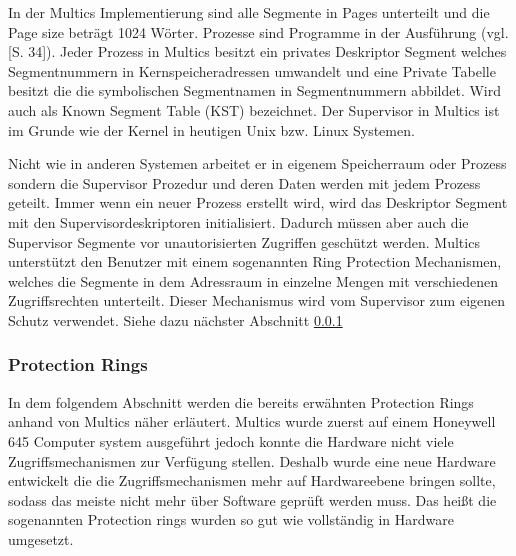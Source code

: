\documentclass[german, 9pt,technote]{IEEEtran}
\begin{document}
	      In der Multics Implementierung sind alle Segmente in Pages unterteilt und die Page size betr\"agt 1024 W\"orter.
        Prozesse sind Programme in der Ausf\"uhrung (vgl. \cite{inproc:multics}[S. 34]). 
		    Jeder Prozess in Multics besitzt ein privates Deskriptor Segment welches Segmentnummern in Kernspeicheradressen umwandelt und eine Private Tabelle besitzt   
		    die die symbolischen Segmentnamen in Segmentnummern abbildet. Wird auch als Known Segment Table (KST) bezeichnet.
		    Der Supervisor in Multics ist im Grunde wie der Kernel in heutigen Unix bzw. Linux Systemen.
		   
      Nicht wie in anderen Systemen arbeitet er in eigenem Speicherraum oder Prozess sondern die Supervisor Prozedur und deren Daten werden mit jedem Prozess
    	  geteilt. Immer wenn ein neuer Prozess erstellt wird, wird das Deskriptor Segment mit den Supervisordeskriptoren initialisiert.
    	  Dadurch m\"ussen aber auch die Supervisor Segmente vor unautorisierten Zugriffen gesch\"utzt werden.
    	  Multics unterst\"utzt den Benutzer mit einem sogenannten Ring Protection Mechanismen, welches die Segmente in dem Adressraum in einzelne Mengen mit 
    		verschiedenen Zugriffsrechten unterteilt. Dieser Mechanismus wird vom Supervisor zum eigenen Schutz verwendet. Siehe dazu n\"achster Abschnitt 
    		\ref{subsubsec:protectrings}
    		
      \subsubsection{Protection Rings} \label{subsubsec:protectrings}
        In dem folgendem Abschnitt werden die bereits erw\"ahnten Protection Rings anhand von Multics n\"aher erl\"autert.
        Multics wurde zuerst auf einem Honeywell 645 Computer system ausgef\"uhrt jedoch konnte die Hardware nicht viele Zugriffsmechanismen zur Verf\"ugung stellen.
        Deshalb wurde eine neue Hardware entwickelt die die Zugriffsmechanismen mehr auf Hardwareebene bringen sollte, sodass das meiste nicht mehr \"uber Software
        gepr\"uft werden muss. Das hei\ss t die sogenannten Protection rings wurden so gut wie vollst\"andig in Hardware umgesetzt. \cite{inproc:protec-rings}
    
\end{document}
